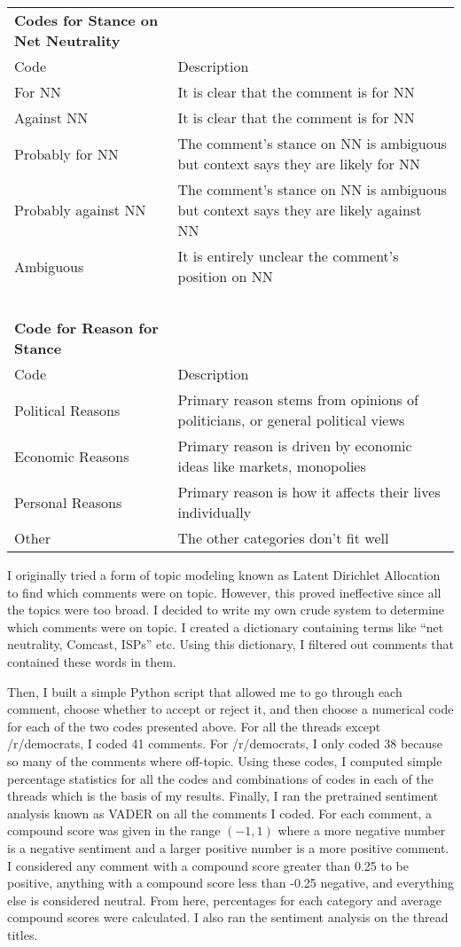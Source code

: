 \documentclass[11pt]{article}
\begin{document}
	\begin{small}
		\begin{tabular}{l|l}
			\multicolumn{1}{l}{\textbf{Codes for Stance on Net Neutrality}} & \\
			Code & Description \\\hline
			For NN & It is clear that the comment is for NN \\
			Against NN & It is clear that the comment is for NN \\
			Probably for NN & The comment's stance on NN is ambiguous but context says they are likely for NN \\
			Probably against NN & The comment's stance on NN is ambiguous but context says they are likely against NN \\
			Ambiguous & It is entirely unclear the comment's position on NN \\
			\multicolumn{1}{l}{} & \ \\
			\multicolumn{1}{l}{\textbf{Code for Reason for Stance}} & \\
			Code  & Description \\\hline
			Political Reasons & Primary reason stems from opinions of politicians, or general political views \\
			Economic Reasons & Primary reason is driven by economic ideas like markets, monopolies\\
			Personal Reasons & Primary reason is how it affects their lives individually  \\
			Other & The other categories don't fit well
		\end{tabular}
	\end{small}
	
	
	I originally tried a form of topic modeling known as Latent Dirichlet Allocation to find which comments were on topic. However, this proved ineffective since all the topics were too broad. I decided to write my own crude system to determine which comments were on topic. I created a dictionary containing terms like ``net neutrality, Comcast, ISPs'' etc. Using this dictionary, I filtered out comments that contained these words in them. 
	
	Then, I built a simple Python script that allowed me to go through each comment, choose whether to accept or reject it, and then choose a numerical code for each of the two codes presented above. For all the threads except /r/democrats, I coded 41 comments. For /r/democrats, I only coded 38 because so many of the comments where off-topic. Using these codes, I computed simple percentage statistics for all the codes and combinations of codes in each of the threads which is the basis of my results. Finally, I ran the pretrained sentiment analysis known as VADER \cite{hutto2014vader} on all the comments I coded. For each comment, a compound score was given in the range $(-1,1)$ where a more negative number is a negative sentiment and a larger positive number is a more positive comment. I considered any comment with a compound score greater than 0.25 to be positive, anything with a compound score less than -0.25 negative, and everything else is considered neutral. From here, percentages for each category and average compound scores were calculated. I also ran the sentiment analysis on the thread titles. 
\end{document}
